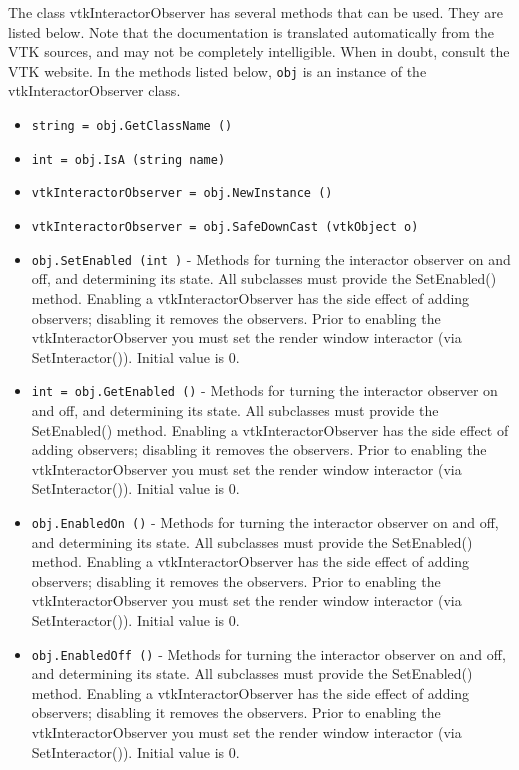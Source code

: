 The class vtkInteractorObserver has several methods that can be used.
  They are listed below.
Note that the documentation is translated automatically from the VTK sources,
and may not be completely intelligible.  When in doubt, consult the VTK website.
In the methods listed below, \verb|obj| is an instance of the vtkInteractorObserver class.
\begin{itemize}
\item  \verb|string = obj.GetClassName ()|

\item  \verb|int = obj.IsA (string name)|

\item  \verb|vtkInteractorObserver = obj.NewInstance ()|

\item  \verb|vtkInteractorObserver = obj.SafeDownCast (vtkObject o)|

\item  \verb|obj.SetEnabled (int )| -  Methods for turning the interactor observer on and off, and determining
 its state. All subclasses must provide the SetEnabled() method.
 Enabling a vtkInteractorObserver has the side effect of adding
 observers; disabling it removes the observers. Prior to enabling the
 vtkInteractorObserver you must set the render window interactor (via
 SetInteractor()). Initial value is 0.

\item  \verb|int = obj.GetEnabled ()| -  Methods for turning the interactor observer on and off, and determining
 its state. All subclasses must provide the SetEnabled() method.
 Enabling a vtkInteractorObserver has the side effect of adding
 observers; disabling it removes the observers. Prior to enabling the
 vtkInteractorObserver you must set the render window interactor (via
 SetInteractor()). Initial value is 0.

\item  \verb|obj.EnabledOn ()| -  Methods for turning the interactor observer on and off, and determining
 its state. All subclasses must provide the SetEnabled() method.
 Enabling a vtkInteractorObserver has the side effect of adding
 observers; disabling it removes the observers. Prior to enabling the
 vtkInteractorObserver you must set the render window interactor (via
 SetInteractor()). Initial value is 0.

\item  \verb|obj.EnabledOff ()| -  Methods for turning the interactor observer on and off, and determining
 its state. All subclasses must provide the SetEnabled() method.
 Enabling a vtkInteractorObserver has the side effect of adding
 observers; disabling it removes the observers. Prior to enabling the
 vtkInteractorObserver you must set the render window interactor (via
 SetInteractor()). Initial value is 0.


\end{itemize}
